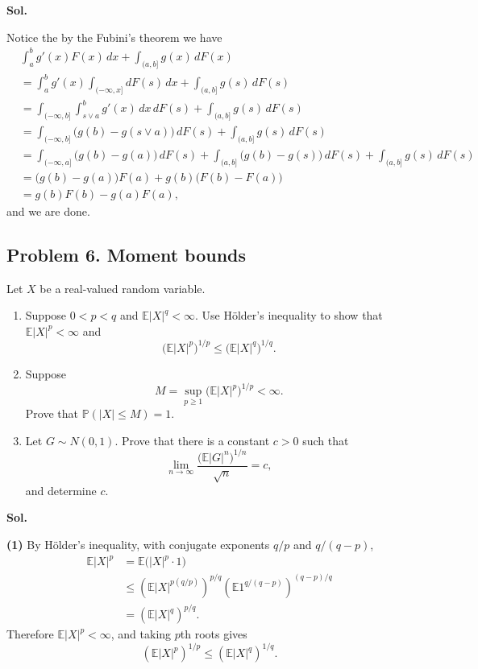 \documentclass[lang=en,11pt,a4paper,citestyle=authoryear]{elegantpaper}
\begin{document}
\vspace{0.5em}
\textbf{Sol.}\par
Notice the by the Fubini's theorem we have
\[
\begin{aligned}
&\int_a^b g'(x)F(x)\,dx+
  \int_{(a,b]}g(x)\,dF(x)\\
&=\int_a^b g'(x)\int_{(-\infty,x]}dF(s)\,dx
  +\int_{(a,b]}g(s)\,dF(s)\\
&=\int_{(-\infty,b]}\int_{s\vee a}^{b}g'(x)\,dx\,dF(s)
  +\int_{(a,b]}g(s)\,dF(s)\\
&=\int_{(-\infty,b]}\bigl(g(b)-g(s\vee a)\bigr)\,dF(s)
  +\int_{(a,b]}g(s)\,dF(s)\\
&=\int_{(-\infty,a]}\bigl(g(b)-g(a)\bigr)\,dF(s)
  +\int_{(a,b]}\bigl(g(b)-g(s)\bigr)\,dF(s)
  +\int_{(a,b]}g(s)\,dF(s)\\
&=\bigl(g(b)-g(a)\bigr)F(a)
  +g(b)\bigl(F(b)-F(a)\bigr)\\
&=g(b)F(b)-g(a)F(a),
\end{aligned}
\]
and we are done.

\vspace{0.5em}
\subsection*{Problem 6. Moment bounds}

Let $X$ be a real-valued random variable.

\begin{enumerate}[label=(\arabic*),leftmargin=*]
    \item Suppose $0<p<q$ and $\mathbb E|X|^q<\infty$. Use H\"older's
    inequality to show that $\mathbb E|X|^p<\infty$ and
    \[
    \bigl(\mathbb E|X|^p\bigr)^{1/p}
    \leq \bigl(\mathbb E|X|^q\bigr)^{1/q}.
    \]

    \item Suppose
    \[
    M=\sup_{p\geq1}\bigl(\mathbb E|X|^p\bigr)^{1/p}<\infty.
    \]
    Prove that $\mathbb P(|X|\leq M)=1$.

    \item[(3)] Let $G\sim N(0,1)$. Prove that there is a
    constant $c>0$ such that
    \[
    \lim_{n\to\infty}
    \frac{\bigl(\mathbb E|G|^n\bigr)^{1/n}}{\sqrt n}=c,
    \]
    and determine $c$.
\end{enumerate}

\vspace{0.5em}
\textbf{Sol.}\par

\textbf{(1)} By H\"older's inequality, with conjugate exponents
$q/p$ and $q/(q-p)$,
\[
\begin{aligned}
\mathbb E|X|^p
&=\mathbb E\bigl(|X|^p\cdot1\bigr)\\
&\leq
\left(\mathbb E|X|^{p(q/p)}\right)^{p/q}
\left(\mathbb E1^{q/(q-p)}\right)^{(q-p)/q}\\
&=\left(\mathbb E|X|^q\right)^{p/q}.
\end{aligned}
\]
Therefore $\mathbb E|X|^p<\infty$, and taking $p$th roots gives
\[
\left(\mathbb E|X|^p\right)^{1/p}
\leq\left(\mathbb E|X|^q\right)^{1/q}.
\]
\end{document}
